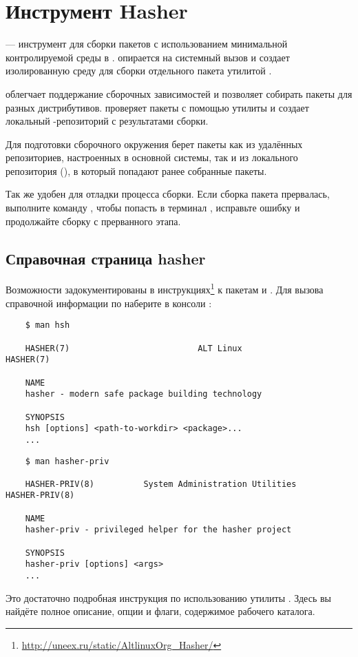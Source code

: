 \chapter{Инструмент Hasher}\label{chapter-hasher}
 --- инструмент для сборки пакетов с использованием минимальной контролируемой среды в .  опирается на системный вызов  и создает изолированную среду для сборки отдельного пакета утилитой .

 облегчает поддержание сборочных зависимостей и позволяет собирать пакеты для разных дистрибутивов.  проверяет пакеты с помощью утилиты  и создает локальный -репозиторий с результатами сборки.

Для подготовки сборочного окружения  берет пакеты как из удалённых репозиториев, настроенных в основной системы, так и из локального репозитория (), в который попадают ранее собранные пакеты.

Так же  удобен для отладки процесса сборки. Если сборка пакета прервалась, выполните команду , чтобы попасть в терминал , исправьте ошибку и продолжайте сборку с прерванного этапа.


\section{Справочная страница hasher}
Возможности  задокументированы в инструкциях\footnote{\href{http://uneex.ru/static/AltlinuxOrg_Hasher/}{http://uneex.ru/static/AltlinuxOrg\_Hasher/}} к пакетам  и . Для вызова справочной информации по  наберите в консоли :
\begin{verbatim}
	$ man hsh
	
	HASHER(7)                          ALT Linux                         HASHER(7)
	
	NAME
	hasher - modern safe package building technology
	
	SYNOPSIS
	hsh [options] <path-to-workdir> <package>...
	...
\end{verbatim} 

\begin{verbatim}
	$ man hasher-priv
	
	HASHER-PRIV(8)          System Administration Utilities         HASHER-PRIV(8)
	
	NAME
	hasher-priv - privileged helper for the hasher project
	
	SYNOPSIS
	hasher-priv [options] <args>
	...
\end{verbatim}

Это достаточно подробная инструкция по использованию утилиты . Здесь вы найдёте полное описание, опции и флаги, содержимое рабочего каталога. 